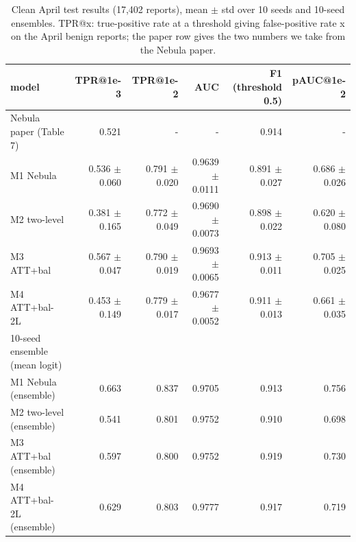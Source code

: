 \begin{table}[t]
\centering
\small
\caption{Clean April test results (17,402 reports), mean $\pm$ std over 10 seeds and 10-seed ensembles. TPR@x: true-positive rate at a threshold giving false-positive rate x on the April benign reports; the paper row gives the two numbers we take from the Nebula paper.}
\label{tab:T4_clean_results}
\begin{tabular}{lrrrrr}
\toprule
model & TPR@1e-3 & TPR@1e-2 & AUC & F1 (threshold 0.5) & pAUC@1e-2 \\
\midrule
Nebula paper (Table 7) & 0.521 & - & - & 0.914 & - \\
M1 Nebula & 0.536 $\pm$ 0.060 & 0.791 $\pm$ 0.020 & 0.9639 $\pm$ 0.0111 & 0.891 $\pm$ 0.027 & 0.686 $\pm$ 0.026 \\
M2 two-level & 0.381 $\pm$ 0.165 & 0.772 $\pm$ 0.049 & 0.9690 $\pm$ 0.0073 & 0.898 $\pm$ 0.022 & 0.620 $\pm$ 0.080 \\
M3 ATT+bal & 0.567 $\pm$ 0.047 & 0.790 $\pm$ 0.019 & 0.9693 $\pm$ 0.0065 & 0.913 $\pm$ 0.011 & 0.705 $\pm$ 0.025 \\
M4 ATT+bal-2L & 0.453 $\pm$ 0.149 & 0.779 $\pm$ 0.017 & 0.9677 $\pm$ 0.0052 & 0.911 $\pm$ 0.013 & 0.661 $\pm$ 0.035 \\
10-seed ensemble (mean logit) &  &  &  &  &  \\
M1 Nebula (ensemble) & 0.663 & 0.837 & 0.9705 & 0.913 & 0.756 \\
M2 two-level (ensemble) & 0.541 & 0.801 & 0.9752 & 0.910 & 0.698 \\
M3 ATT+bal (ensemble) & 0.597 & 0.800 & 0.9752 & 0.919 & 0.730 \\
M4 ATT+bal-2L (ensemble) & 0.629 & 0.803 & 0.9777 & 0.917 & 0.719 \\
\bottomrule
\end{tabular}
\end{table}
